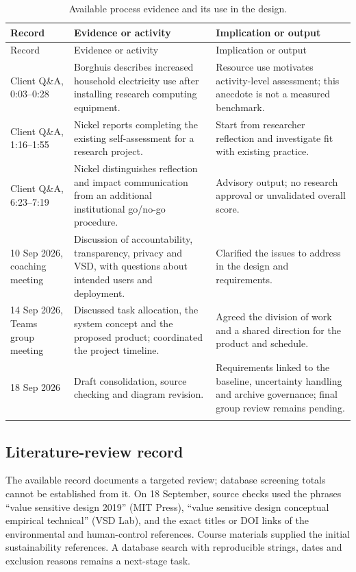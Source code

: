 \documentclass[11pt,a4paper]{article}
\begin{document}
\begin{longtable}{@{}p{}p{}p{}@{}}
\toprule
Record & Evidence or activity & Implication or output \\
\midrule\endfirsthead
\toprule Record & Evidence or activity & Implication or output \\
\midrule\endhead
Client Q\&A, 0:03--0:28 & Borghuis describes increased household electricity use after installing research computing equipment. & Resource use motivates activity-level assessment; this anecdote is not a measured benchmark. \\
\midrule
Client Q\&A, 1:16--1:55 & Nickel reports completing the existing self-assessment for a research project. & Start from researcher reflection and investigate fit with existing practice. \\
\midrule
Client Q\&A, 6:23--7:19 & Nickel distinguishes reflection and impact communication from an additional institutional go/no-go procedure. & Advisory output; no research approval or unvalidated overall score. \\
\midrule
10 Sep 2026, coaching meeting & Discussion of accountability, transparency, privacy and VSD, with questions about intended users and deployment. & Clarified the issues to address in the design and requirements. \\
\midrule
14 Sep 2026, Teams group meeting & Discussed task allocation, the system concept and the proposed product; coordinated the project timeline. & Agreed the division of work and a shared direction for the product and schedule. \\
\midrule
18 Sep 2026 & Draft consolidation, source checking and diagram revision. & Requirements linked to the baseline, uncertainty handling and archive governance; final group review remains pending. \\
\bottomrule
\caption{Available process evidence and its use in the design.}\\
\end{longtable}

\subsection*{Literature-review record}
The available record documents a targeted review; database screening totals cannot be established from it. On 18 September, source checks used the phrases ``value sensitive design 2019'' (MIT Press), ``value sensitive design conceptual empirical technical'' (VSD Lab), and the exact titles or DOI links of the environmental and human-control references. Course materials supplied the initial sustainability references. A database search with reproducible strings, dates and exclusion reasons remains a next-stage task.
\end{document}
